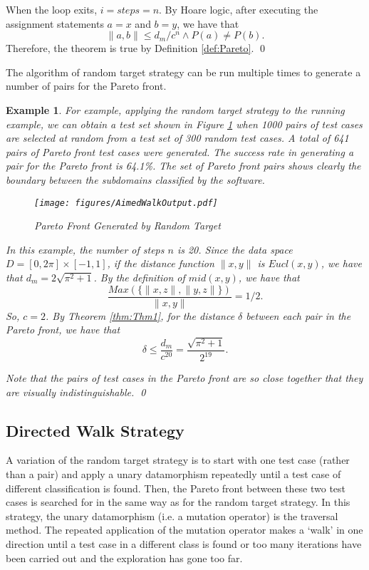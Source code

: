 \documentclass[preprint,1p,authoryear,times]{elsarticle}
\newtheorem{Example}{Example}
\begin{document}
When the loop exits, $i = steps=n$. By Hoare logic, after executing the assignment statements $a=x$ and $b=y$, we have that 
\[\|a,b\| \leq d_m/c^n \wedge P(a) \neq P(b).\] 
Therefore, the theorem is true by Definition \ref{def:Pareto}. 
\qed

The algorithm of random target strategy can be run multiple times to generate a number of pairs for the Pareto front. 
\begin{Example}\label{exm:Exm1}
For example, applying the random target strategy to the running example, we can obtain a test set shown in Figure \ref{fig:AimedWalkResult} when 1000 pairs of test cases are selected at random from a test set of 300 random test cases. A total of 641 pairs of Pareto front test cases were generated. The success rate in  generating a pair for the Pareto front is 64.1\%. The set of Pareto front pairs shows clearly the boundary between the subdomains classified by the software.  

\begin{figure}[htbp]
	\centering
	\texttt{[image: figures/AimedWalkOutput.pdf]}\\
	\caption{Pareto Front Generated by Random Target}
	\label{fig:AimedWalkResult}
\end{figure}

In this example, the number of steps $n$ is 20. Since the data space $D=[0, 2\pi]\times[-1,1]$, if the distance function $\|x,y\|$ is $Eucl(x,y)$, we have that $d_m=2\sqrt{\pi^2+1}$. By the definition of $mid(x,y)$, we have that 
\[\frac{Max(\{\|x,z\|, \|y,z\|\})}{\|x,y\|}=1/2.\] 
So, $c=2$. By Theorem \ref{thm:Thm1}, for the distance $\delta$ between each pair in the Pareto front, we have that 
\[\delta \leq \frac{d_m}{c^{20}} = \frac{\sqrt{\pi^2+1}}{2^{19}}.\] 

Note that the pairs of test cases in the Pareto front are so close together that they are visually indistinguishable.
\qed
\end{Example}

\subsection{Directed Walk Strategy}

A variation of the random target strategy is to start with one test case (rather than a pair) and apply a unary datamorphism repeatedly until a test case of different classification is found. Then, the Pareto front between these two test cases is searched for in the same way as for the random target strategy. In this strategy, the unary datamorphism (i.e. a mutation operator) is the traversal method. The repeated application of the mutation operator makes a `walk' in one direction until a test case in a different class is found or too many iterations have been carried out and the exploration has gone too far.
\end{document}
